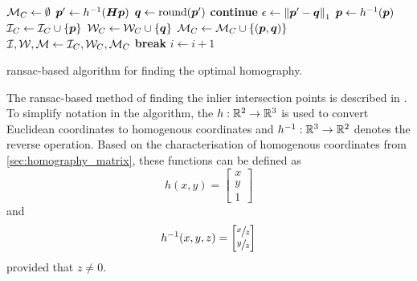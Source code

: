 \documentclass[../report.tex]{subfiles}
\begin{document}
\begin{algorithm}
\begin{algorithmic}[1]
                    \State ${\mathcal{M}}_C \gets \emptyset$ 
                    \ForAll{$\vp \in \sP$}
                        \label{alg:ransac:for_loop_over_all_points}
                        \State ${\bm{p}}' \gets h^{-1}({\bm{H}} {\bm{p}})$ 
                        \label{alg:ransac:warp}
                        \State ${\bm{q}} \gets \text{round}({\bm{p}}')$ 
                         
                            \State \textbf{continue}
                        \EndIf
                        \State $\epsilon \gets \left\lVert{\bm{p}}' - {\bm{q}}\right\rVert_1$ \label{alg:ransac:error}
                         
                            \State ${\bm{p}} \gets h^{-1}({\bm{p}})$
                            \State ${\mathcal{I}}_C \gets {\mathcal{I}}_C \cup \{{\bm{p}}\}$ 
                            \State ${\mathcal{W}}_C \gets {\mathcal{W}}_C \cup \{{\bm{q}}\}$
                            \State ${\mathcal{M}}_C \gets {\mathcal{M}}_C \cup \{({\bm{p}}, {\bm{q}})\}$
                        \EndIf
                    \EndFor
                     
                        \State ${\mathcal{I}},{\mathcal{W}},{\mathcal{M}} \gets {\mathcal{I}}_C,{\mathcal{W}}_C,{\mathcal{M}}_C$
                    \EndIf
                \EndFor
            \EndFor
                \textbf{break}
            \EndIIf {}
            \State $i \gets i + 1$
        \EndWhile
    \end{algorithmic}
    \caption{\acs{ransac}-based algorithm for finding the optimal homography.}
    \label{alg:ransac}
\end{algorithm}
The \gls{ransac}-based method of finding the inlier intersection points is described in . 
To simplify notation in the algorithm, the $h : \mathbb{R}^2 \to \mathbb{R}^3$ is used to convert Euclidean coordinates to homogenous coordinates and $h^{-1} : \mathbb{R}^3 \to \mathbb{R}^2$ denotes the reverse operation.
Based on the characterisation of homogenous coordinates from \cref{sec:homography_matrix}, these functions can be defined as
\begin{equation*}
    h(x,y) = \begin{bmatrix}
        x\\y\\1
    \end{bmatrix}
\end{equation*}
and
\begin{equation*}
    h^{-1}(x,y,z) = \begin{bmatrix}
        \sfrac{x}{z}\\
        \sfrac{y}{z}
    \end{bmatrix}
\end{equation*}
provided that $z \neq 0$.
\end{document}
